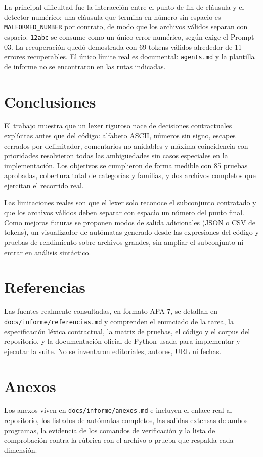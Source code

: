 \documentclass[11pt,a4paper]{article}
\begin{document}
La principal dificultad fue la interacción entre el punto de fin de
cláusula y el detector numérico: una cláusula que termina en número
sin espacio es \verb|MALFORMED_NUMBER| por contrato, de modo que los
archivos válidos separan con espacio. \verb|12abc| se consume como un
único error numérico, según exige el Prompt 03. La recuperación
quedó demostrada con 69 tokens válidos alrededor de 11
errores recuperables. El único límite real es documental:
\verb|agents.md| y la plantilla de informe no se encontraron en las
rutas indicadas.

\section{Conclusiones}
El trabajo muestra que un lexer riguroso nace de decisiones
contractuales explícitas antes que del código: alfabeto ASCII,
números sin signo, escapes cerrados por delimitador, comentarios no
anidables y máxima coincidencia con prioridades resolvieron todas las
ambigüedades sin casos especiales en la implementación. Los objetivos
se cumplieron de forma medible con 85 pruebas aprobadas, cobertura
total de categorías y familias, y dos archivos completos que
ejercitan el recorrido real.

Las limitaciones reales son que el lexer solo reconoce el subconjunto
contratado y que los archivos válidos deben separar con espacio un
número del punto final. Como mejoras futuras se
proponen modos de salida adicionales (JSON o CSV de tokens), un
visualizador de autómatas generado desde las expresiones del código y
pruebas de rendimiento sobre archivos grandes, sin ampliar el
subconjunto ni entrar en análisis sintáctico.

\section{Referencias}
Las fuentes realmente consultadas, en formato APA 7, se detallan en
\verb|docs/informe/referencias.md| y comprenden el enunciado de la
tarea, la especificación léxica contractual, la matriz de pruebas, el
código y el corpus del repositorio, y la documentación oficial de
Python usada para implementar y ejecutar la suite. No se inventaron
editoriales, autores, URL ni fechas.

\section{Anexos}
Los anexos viven en \verb|docs/informe/anexos.md| e incluyen el
enlace real al repositorio, los listados de autómatas completos, las
salidas extensas de ambos programas, la evidencia de los comandos de
verificación y la lista de comprobación contra la rúbrica con el
archivo o prueba que respalda cada dimensión.
\end{document}

